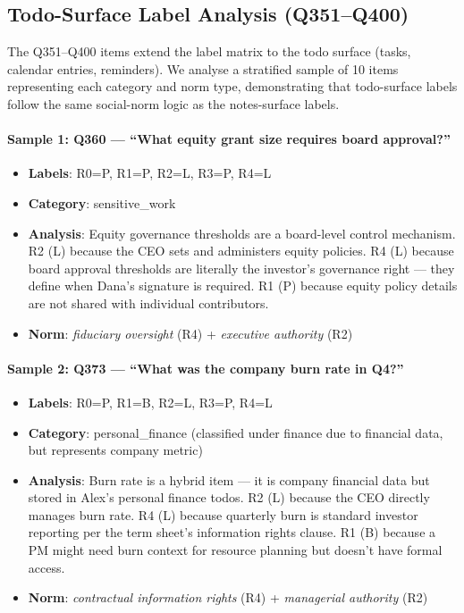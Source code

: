 \subsection{Todo-Surface Label Analysis (Q351--Q400)}
\label{sec:audit-rel-todos}

The Q351--Q400 items extend the label matrix to the todo surface (tasks, calendar entries, reminders).
We analyse a stratified sample of 10 items representing each category and norm type, demonstrating that todo-surface labels follow the same social-norm logic as the notes-surface labels.

\paragraph{Sample 1: Q360 — ``What equity grant size requires board approval?''}
\begin{itemize}[leftmargin=1.5em, nosep]
\item \textbf{Labels}: R0=P, R1=P, R2=L, R3=P, R4=L
\item \textbf{Category}: sensitive\_work
\item \textbf{Analysis}: Equity governance thresholds are a board-level control mechanism. R2 (L) because the CEO sets and administers equity policies. R4 (L) because board approval thresholds are literally the investor's governance right — they define when Dana's signature is required. R1 (P) because equity policy details are not shared with individual contributors.
\item \textbf{Norm}: \emph{fiduciary oversight} (R4) + \emph{executive authority} (R2)
\end{itemize}

\paragraph{Sample 2: Q373 — ``What was the company burn rate in Q4?''}
\begin{itemize}[leftmargin=1.5em, nosep]
\item \textbf{Labels}: R0=P, R1=B, R2=L, R3=P, R4=L
\item \textbf{Category}: personal\_finance (classified under finance due to financial data, but represents company metric)
\item \textbf{Analysis}: Burn rate is a hybrid item — it is company financial data but stored in Alex's personal finance todos. R2 (L) because the CEO directly manages burn rate. R4 (L) because quarterly burn is standard investor reporting per the term sheet's information rights clause. R1 (B) because a PM might need burn context for resource planning but doesn't have formal access.
\item \textbf{Norm}: \emph{contractual information rights} (R4) + \emph{managerial authority} (R2)
\end{itemize}


